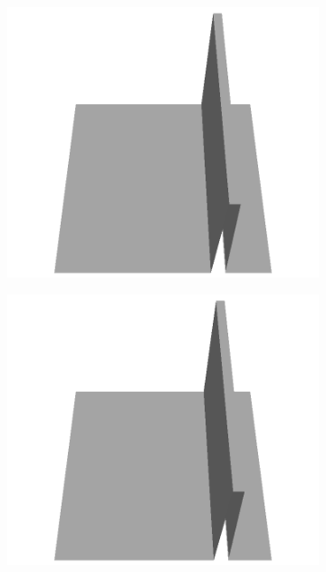 \documentclass[../document.tex]{subfiles}
\begin{document}
\begin{figure}[H]
\begin{subfigure}[b]{0.065\textwidth}
    \includegraphics[width=\linewidth]{../img/5/custom_patches/walls_front/all/33-3d.png}
    \end{subfigure}
    \begin{subfigure}[b]{0.065\textwidth}
    \includegraphics[width=\linewidth]{../img/5/custom_patches/walls_front/all/32-3d.png}
    \end{subfigure}
    \begin{subfigure}[b]{0.065\textwidth}

\end{subfigure}
\end{figure}
\end{document}
